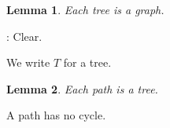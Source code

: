 \documentclass{article}
\newtheorem{lem}{Lemma}
\begin{document}
\begin{lem} Each tree is a graph. \end{lem}

\proof:  Clear.

We write $T$ for a tree.

\begin{lem} Each path is a tree.
\end{lem}

\proof A path has no cycle.
\end{document}
